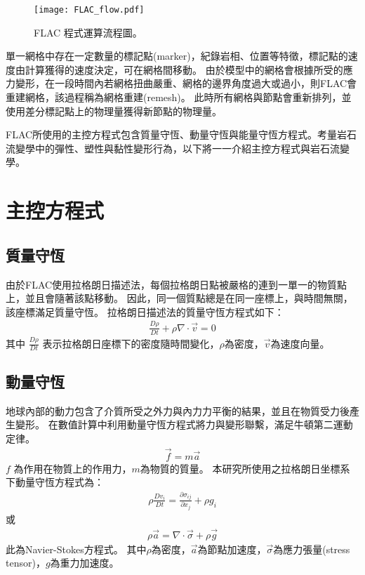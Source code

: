 \begin{figure*}[ht!]
    \centering
    \texttt{[image: FLAC\_flow.pdf]}
    \caption[FLAC 程式運算流程圖]{FLAC 程式運算流程圖。}
    \label{fig::FLAC_method}
\end{figure*}
單一網格中存在一定數量的標記點(marker)，紀錄岩相、位置等特徵，標記點的速度由計算獲得的速度決定，可在網格間移動。
由於模型中的網格會根據所受的應力變形，在一段時間內若網格扭曲嚴重、網格的邊界角度過大或過小，則FLAC會重建網格，該過程稱為網格重建(remesh)。
此時所有網格與節點會重新排列，並使用差分標記點上的物理量獲得新節點的物理量。

FLAC所使用的主控方程式包含質量守恆、動量守恆與能量守恆方程式。考量岩石流變學中的彈性、塑性與黏性變形行為，以下將一一介紹主控方程式與岩石流變學。
\section{主控方程式}

\subsection{質量守恆}
由於FLAC使用拉格朗日描述法，每個拉格朗日點被嚴格的連到一單一的物質點上，並且會隨著該點移動。
因此，同一個質點總是在同一座標上，與時間無關，該座標滿足質量守恆。
拉格朗日描述法的質量守恆方程式如下：
\begin{align}
\frac{D\rho}{Dt}+\rho\nabla\cdot\vec v =0 
\label{eqn:MASS_Lagrangian}
\end{align}
其中 $\frac{D\rho}{Dt}$ 表示拉格朗日座標下的密度隨時間變化，$\rho$為密度，$\vec v$為速度向量。

\subsection{動量守恆}
地球內部的動力包含了介質所受之外力與內力力平衡的結果，並且在物質受力後產生變形。
在數值計算中利用動量守恆方程式將力與變形聯繫，滿足牛頓第二運動定律。
\begin{align}
\vec f=m\vec a
\end{align}
$f$ 為作用在物質上的作用力，$m$為物質的質量。
本研究所使用之拉格朗日坐標系下動量守恆方程式為：
\begin{align}
\rho \frac{ Dv_{i}}{Dt} = \frac{\partial \sigma_{ij}}{\partial x_j}+\rho g_i\label{eqn:momentum Lagrangian}
\end{align}
或
\begin{align}
\rho \vec a = \nabla\cdot\vec\sigma+\rho\vec g\label{eqn:momentum Lagrangian2}
\end{align}
此為Navier-Stokes方程式。 其中$\rho$為密度，$\vec a$為節點加速度，$\vec\sigma$為應力張量(stress tensor)，$g$為重力加速度。

